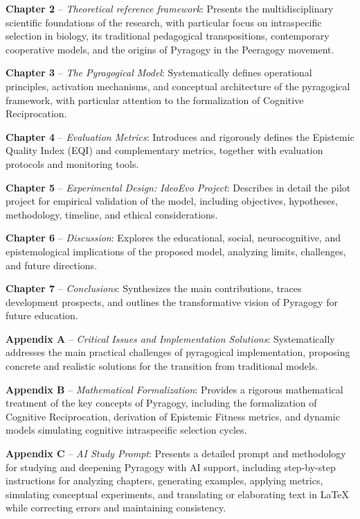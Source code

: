 \textbf{Chapter 2} -- \textit{Theoretical reference framework}: Presents the multidisciplinary scientific foundations of the research, with particular focus on intraspecific selection in biology, its traditional pedagogical transpositions, contemporary cooperative models, and the origins of Pyragogy in the Peeragogy movement.

\textbf{Chapter 3} -- \textit{The Pyragogical Model}: Systematically defines operational principles, activation mechanisms, and conceptual architecture of the pyragogical framework, with particular attention to the formalization of Cognitive Reciprocation.

\textbf{Chapter 4} -- \textit{Evaluation Metrics}: Introduces and rigorously defines the Epistemic Quality Index (EQI) and complementary metrics, together with evaluation protocols and monitoring tools.

\textbf{Chapter 5} -- \textit{Experimental Design: IdeoEvo Project}: Describes in detail the pilot project for empirical validation of the model, including objectives, hypotheses, methodology, timeline, and ethical considerations.

\textbf{Chapter 6} -- \textit{Discussion}: Explores the educational, social, neurocognitive, and epistemological implications of the proposed model, analyzing limits, challenges, and future directions.

\textbf{Chapter 7} -- \textit{Conclusions}: Synthesizes the main contributions, traces development prospects, and outlines the transformative vision of Pyragogy for future education.

\textbf{Appendix A} -- \textit{Critical Issues and Implementation Solutions}: Systematically addresses the main practical challenges of pyragogical implementation, proposing concrete and realistic solutions for the transition from traditional models.

\textbf{Appendix B} -- \textit{Mathematical Formalization}: Provides a rigorous mathematical treatment of the key concepts of Pyragogy, including the formalization of Cognitive Reciprocation, derivation of Epistemic Fitness metrics, and dynamic models simulating cognitive intraspecific selection cycles.

\textbf{Appendix C} -- \textit{AI Study Prompt}: Presents a detailed prompt and methodology for studying and deepening Pyragogy with AI support, including step-by-step instructions for analyzing chapters, generating examples, applying metrics, simulating conceptual experiments, and translating or elaborating text in LaTeX while correcting errors and maintaining consistency.


